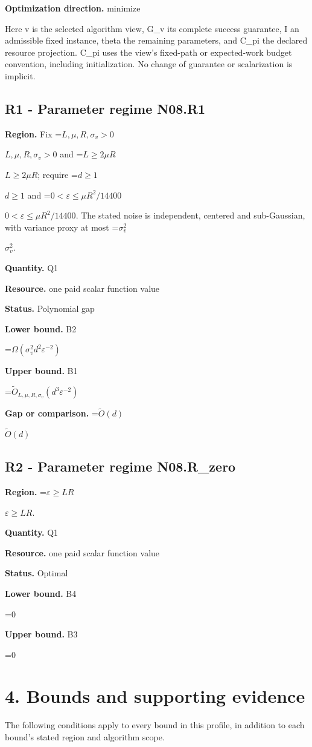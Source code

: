 \documentclass[10pt,a4paper]{article}
\newcommand{\AtlasMath}[1]{\par\begingroup\centering\setbox0=\hbox{$\displaystyle #1$}\ifdim\wd0>1.4\linewidth\typeout{ATLAS WIDE FORMULA: \the\wd0}\fi\ifdim\wd0>\linewidth\resizebox{\linewidth}{!}{\box0}\else\box0\fi\par\endgroup}
\newcommand{\AtlasInlineMath}[1]{\begingroup\setbox0=\hbox{$#1$}\ifdim\wd0>.4\linewidth\endgroup\AtlasMath{#1}\else\endgroup$#1$\fi}
\begin{document}
\textbf{Optimization direction.} minimize

Here v is the selected algorithm view, G\_v its complete success guarantee, I an admissible fixed instance, theta the remaining parameters, and C\_pi the declared resource projection. C\_pi uses the view's fixed-path or expected-work budget convention, including initialization. No change of guarantee or scalarization is implicit.

\subsection{R1 - Parameter regime N08.R1}
\textbf{Region.} Fix \AtlasInlineMath{L,\mu,R,\sigma_v>0} and \AtlasInlineMath{L\ge2\mu R}; require \AtlasInlineMath{d\ge1} and \AtlasInlineMath{0<\varepsilon\le\mu R^2/14400}. The stated noise is independent, centered and sub-Gaussian, with variance proxy at most \AtlasInlineMath{\sigma_v^2}.

\textbf{Quantity.} Q1

\textbf{Resource.} one paid scalar function value

\textbf{Status.} Polynomial gap

\textbf{Lower bound.} B2

\AtlasMath{\Omega(\sigma_v^2d^2\varepsilon^{-2})}
\textbf{Upper bound.} B1

\AtlasMath{\widetilde{O}_{L,\mu,R,\sigma_v}(d^3\varepsilon^{-2})}
\textbf{Gap or comparison.} \AtlasInlineMath{\widetilde{O}(d)}

\subsection{R2 - Parameter regime N08.R\_zero}
\textbf{Region.} \AtlasInlineMath{\varepsilon\ge LR}.

\textbf{Quantity.} Q1

\textbf{Resource.} one paid scalar function value

\textbf{Status.} Optimal

\textbf{Lower bound.} B4

\AtlasMath{0}
\textbf{Upper bound.} B3

\AtlasMath{0}
\section{4. Bounds and supporting evidence}
The following conditions apply to every bound in this profile, in addition to each bound's stated region and algorithm scope.
\end{document}

